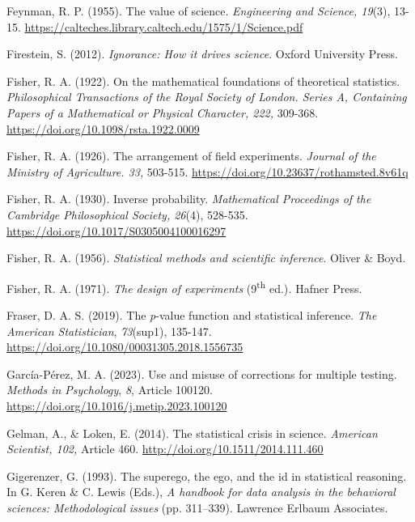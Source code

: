 \documentclass[authordate, meta]{jote-new-article}
\begin{document}
	Feynman, R. P. (1955). The value of science. \emph{Engineering and Science, 19}(3), 13-15. \url{https://calteches.library.caltech.edu/1575/1/Science.pdf}



	Firestein, S. (2012). \emph{Ignorance: How it drives science}. Oxford University Press.



	Fisher, R. A. (1922). On the mathematical foundations of theoretical statistics. \emph{Philosophical Transactions of the Royal Society of London. Series A, Containing Papers of a Mathematical or Physical Character, 222,} 309-368. \url{https://doi.org/10.1098/rsta.1922.0009}



	Fisher, R. A. (1926). The arrangement of field experiments. \emph{Journal of the Ministry of Agriculture. 33, }503-515. \url{https://doi.org/10.23637/rothamsted.8v61q}



	Fisher, R. A. (1930). Inverse probability. \emph{Mathematical Proceedings of the Cambridge Philosophical Society, 26}(4), 528-535. \url{https://doi.org/10.1017/S0305004100016297}



	Fisher, R. A. (1956). \emph{Statistical methods and scientific inference}. Oliver \& Boyd.



	Fisher, R. A. (1971). \emph{The design of experiments }(9\textsuperscript{th} ed.)\emph{.} Hafner Press.



	Fraser, D. A. S. (2019). The \emph{p}-value function and statistical inference. \emph{The American Statistician}, \emph{73}(sup1), 135-147. \url{https://doi.org/10.1080/00031305.2018.1556735}



	García-Pérez, M. A. (2023). Use and misuse of corrections for multiple testing. \emph{Methods in Psychology}, \emph{8}, Article 100120. \url{https://doi.org/10.1016/j.metip.2023.100120}



	Gelman, A., \& Loken, E. (2014). The statistical crisis in science. \emph{American Scientist, 102,} Article 460. \url{http://doi.org/10.1511/2014.111.460}



	Gigerenzer, G. (1993). The superego, the ego, and the id in statistical reasoning. In G. Keren \& C. Lewis (Eds.), \emph{A handbook for data analysis in the behavioral sciences: Methodological issues} (pp. 311--339). Lawrence Erlbaum Associates.
\end{document}
